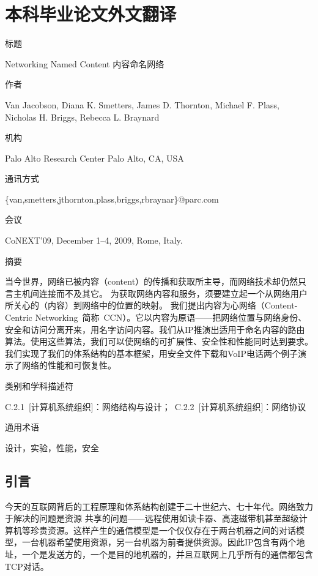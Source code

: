 \chapter{本科毕业论文外文翻译}

\heiti
标题

\songti
Networking Named Content 内容命名网络

\heiti
作者

\songti
Van Jacobson, Diana K. Smetters, James D. Thornton, Michael F. Plass, Nicholas H. Briggs,
Rebecca L. Braynard

\heiti
机构

\songti
Palo Alto Research Center Palo Alto, CA, USA

\heiti
通讯方式

\songti
\{van,smetters,jthornton,plass,briggs,rbraynar\}@parc.com

\heiti
会议

\songti
CoNEXT’09, December 1–4, 2009, Rome, Italy.

\heiti
摘要

\songti
当今世界，网络已被内容（content）的传播和获取所主导，而网络技术却仍然只言主机间连接而不及其它。%
为获取网络内容和服务，须要建立起一个从网络用户所关心的（内容）到网络中的位置的映射。%
我们提出内容为心网络（Content-Centric Networking~简称~CCN）。它以内容为原语——把网络位置与网络身份、安全和访问分离开来，用名字访问内容。我们从IP推演出适用于命名内容的路由算法。使用这些算法，我们可以使网络的可扩展性、安全性和性能同时达到要求。我们实现了我们的体系结构的基本框架，用安全文件下载和VoIP电话两个例子演示了网络的性能和可恢复性。

\heiti
类别和学科描述符

\songti
C.2.1~[计算机系统组织]：网络结构与设计；~C.2.2~[计算机系统组织]：网络协议

\heiti
通用术语

\songti
设计，实验，性能，安全



\section{引言}
今天的互联网背后的工程原理和体系结构创建于二十世纪六、七十年代。网络致力于解决的问题是资源
共享的问题——远程使用如读卡器、高速磁带机甚至超级计算机等珍贵资源。这样产生的通信模型是一个仅仅存在于两台机器之间的对话模型，一台机器希望使用资源，另一台机器为前者提供资源。因此IP包含有两个地址，一个是发送方的，一个是目的地机器的，并且互联网上几乎所有的通信都包含TCP对话。


